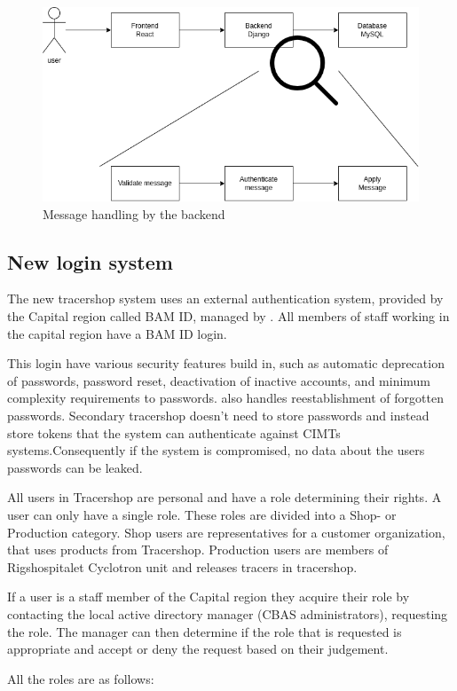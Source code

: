 \documentclass{article}
\begin{document}
\begin{figure}[ht]
  \begin{center}
    \includegraphics[width=0.6\linewidth]{MessageHandeling.png}
    \caption{Message handling by the backend}
    \label{fig:messageHandle}
  \end{center}
\end{figure}

\subsection*{New login system}

The new tracershop system uses an external authentication system, provided by
the Capital region called BAM ID, managed by . All members of staff
working in the capital region have a BAM ID login.

This login have various security features build in, such as automatic
deprecation of passwords, password reset, deactivation of inactive accounts, and
minimum complexity requirements to passwords.  also handles
reestablishment of forgotten passwords.
Secondary tracershop doesn't need to store passwords and instead store tokens
that the system can authenticate against CIMTs systems.Consequently if the
system is compromised, no data about the users passwords can be leaked.

All users in Tracershop are personal and have a role determining their
rights. A user can only have a single role.
These roles are divided into a Shop- or Production category. Shop users are
representatives for a customer organization, that uses products from Tracershop.
Production users are members of Rigshospitalet Cyclotron unit and releases
tracers in tracershop.

If a user is a staff member of the Capital region they acquire their role by
contacting the local active directory manager (CBAS administrators), requesting
the role. The manager can then determine if the role that is requested is
appropriate and accept or deny the request based on their judgement.

All the roles are as follows:
\end{document}
